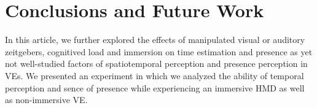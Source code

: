 \documentclass[sigconf]{acmart}
\begin{document}


\section{Conclusions and Future Work}


In this article, we further explored the effects of manipulated visual or auditory zeitgebers, cognitived load and immersion on time estimation and presence as yet not well-studied factors of spatiotemporal perception and presence perception in VEs. We presented an experiment in which we analyzed the ability of temporal perception and sence of presence while experiencing an immersive HMD as well as non-immersive VE. 
\end{document}
